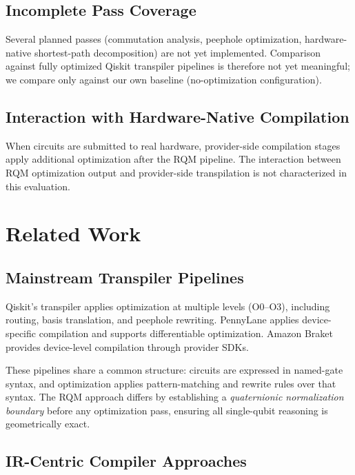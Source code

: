 \documentclass[conference]{IEEEtran}
\begin{document}
\subsection{Incomplete Pass Coverage}

Several planned passes (commutation analysis, peephole optimization, hardware-native
shortest-path decomposition) are not yet implemented. Comparison against fully optimized
Qiskit transpiler pipelines is therefore not yet meaningful; we compare only against our own
baseline (no-optimization configuration).

\subsection{Interaction with Hardware-Native Compilation}

When circuits are submitted to real hardware, provider-side compilation stages apply
additional optimization after the RQM pipeline. The interaction between RQM optimization
output and provider-side transpilation is not characterized in this evaluation.

\section{Related Work}

\subsection{Mainstream Transpiler Pipelines}

Qiskit's transpiler \cite{b1} applies optimization at multiple levels (O0--O3), including
routing, basis translation, and peephole rewriting. PennyLane \cite{b2} applies
device-specific compilation and supports differentiable optimization. Amazon Braket \cite{b3}
provides device-level compilation through provider SDKs.

These pipelines share a common structure: circuits are expressed in named-gate syntax, and
optimization applies pattern-matching and rewrite rules over that syntax. The RQM approach
differs by establishing a \textit{quaternionic normalization boundary} before any optimization
pass, ensuring all single-qubit reasoning is geometrically exact.

\subsection{IR-Centric Compiler Approaches}
\end{document}
